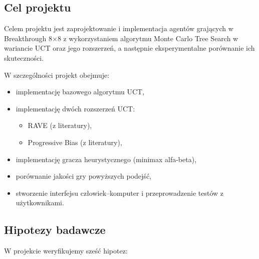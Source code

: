 \subsection{Cel projektu}

Celem projektu jest zaprojektowanie i implementacja agentów grających
w Breakthrough 8$\times$8 z wykorzystaniem algorytmu Monte Carlo Tree Search
w wariancie UCT oraz jego rozszerzeń, a następnie eksperymentalne porównanie
ich skuteczności.

W szczególności projekt obejmuje:
\begin{itemize}[nosep]
    \item implementację bazowego algorytmu UCT,
    \item implementację dwóch rozszerzeń UCT:
          \begin{itemize}[nosep]
              \item RAVE (z literatury),
              \item Progressive Bias (z literatury),
          \end{itemize}
    \item implementację gracza heurystycznego (minimax alfa-beta),
    \item porównanie jakości gry powyższych podejść,
    \item stworzenie interfejsu człowiek--komputer i przeprowadzenie testów
          z użytkownikami.
\end{itemize}

\subsection{Hipotezy badawcze}

W projekcie weryfikujemy sześć hipotez:

